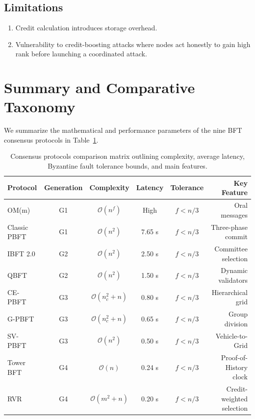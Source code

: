 \documentclass[12pt, oneside, a4paper]{report}
\theoremstyle{definition}
\theoremstyle{remark}
\begin{document}
\subsection{Limitations}
\begin{enumerate}
  \item Credit calculation introduces storage overhead.
  \item Vulnerability to credit-boosting attacks where nodes act honestly to gain high rank before launching a coordinated attack.
\end{enumerate}

\bigskip

\section{Summary and Comparative Taxonomy}
\label{sec:cm:summary}

We summarize the mathematical and performance parameters of the nine BFT consensus protocols in Table~\ref{tab:consensus_parameters_full}.

\begin{table}[htbp]
\centering
\small
\renewcommand{\arraystretch}{1.3}
\begin{tabular}{lccccr}
\toprule
\textbf{Protocol} & \textbf{Generation} & \textbf{Complexity} & \textbf{Latency} & \textbf{Tolerance} & \textbf{Key Feature} \\
\midrule
OM(m)        & G1 & $\mathcal{O}(n^f)$ & High & $f < n/3$ & Oral messages \\
Classic PBFT & G1 & $\mathcal{O}(n^2)$ & 7.65 s & $f < n/3$ & Three-phase commit \\
IBFT 2.0     & G2 & $\mathcal{O}(n^2)$ & 2.50 s & $f < n/3$ & Committee selection \\
QBFT         & G2 & $\mathcal{O}(n^2)$ & 1.50 s & $f < n/3$ & Dynamic validators \\
CE-PBFT      & G3 & $\mathcal{O}(n_c^2 + n)$ & 0.80 s & $f < n/3$ & Hierarchical grid \\
G-PBFT       & G3 & $\mathcal{O}(n_c^2 + n)$ & 0.65 s & $f < n/3$ & Group division \\
SV-PBFT      & G3 & $\mathcal{O}(n^2)$ & 0.50 s & $f < n/3$ & Vehicle-to-Grid \\
Tower BFT    & G4 & $\mathcal{O}(n)$ & 0.24 s & $f < n/3$ & Proof-of-History clock \\
RVR          & G4 & $\mathcal{O}(m^2 + n)$ & 0.20 s & $f < n/3$ & Credit-weighted selection \\
\bottomrule
\end{tabular}
\caption{Consensus protocols comparison matrix outlining complexity, average latency, Byzantine fault tolerance bounds, and main features.}
\label{tab:consensus_parameters_full}
\end{table}
\end{document}
